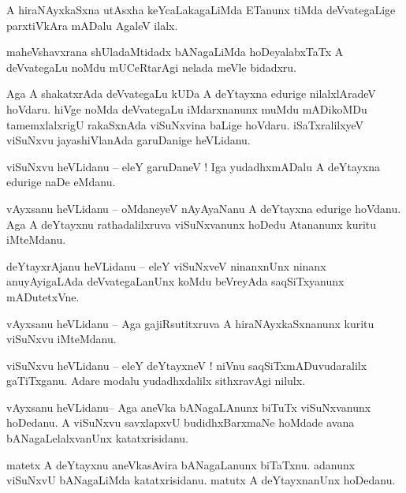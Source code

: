 \documentclass{article}
\begin{document}
\begin{mng}%
A hiraNAyxkaSxna utAsxha keYcaLakagaLiMda ETanunx tiMda deVvategaLige parxtiVkAra mADalu AgaleV ilalx.
\end{mng}

\begin{mng}%
maheVshavxrana shUladaMtidadx bANagaLiMda hoDeyalabxTaTx A deVvategaLu  noMdu mUCeRtarAgi nelada 
meVle bidadxru.
\end{mng}

\begin{mng}%
Aga A shakatxrAda deVvategaLu kUDa A deYtayxna edurige nilalxlAradeV hoVdaru. hiVge noMda 
deVvategaLu iMdarxnanunx muMdu mADikoMDu tamemxlalxrigU rakaSxnAda viSuNxvina baLige hoVdaru. 
iSaTxralilxyeV viSuNxvu jayashiVlanAda garuDanige heVLidanu.
\end{mng}

\begin{mng}%
viSuNxvu heVLidanu -- eleY garuDaneV ! Iga yudadhxmADalu A deYtayxna edurige naDe eMdanu.
\end{mng}

\begin{mng}%
vAyxsanu heVLidanu -- oMdaneyeV nAyAyaNanu A deYtayxna edurige hoVdanu. Aga A deYtayxnu 
rathadalilxruva viSuNxvanunx hoDedu Atananunx kuritu iMteMdanu.
\end{mng}

\begin{mng}%
deYtayxrAjanu heVLidanu -- eleY viSuNxveV ninanxnUnx ninanx anuyAyigaLAda deVvategaLanUnx koMdu 
beVreyAda saqSiTxyanunx mADutetxVne.
\end{mng}

\begin{mng}%
vAyxsanu heVLidanu -- Aga gajiRsutitxruva A hiraNAyxkaSxnanunx kuritu viSuNxvu iMteMdanu.
\end{mng}

\begin{mng}%
viSuNxvu heVLidanu -- eleY deYtayxneV ! niVnu saqSiTxmADuvudaralilx gaTiTxganu. Adare modalu 
yudadhxdalilx sithxravAgi nilulx.
\end{mng}

\begin{mng}%
vAyxsanu heVLidanu-- Aga aneVka bANagaLAnunx biTuTx viSuNxvanunx hoDedanu. A viSuNxvu savxlapxvU 
budidhxBarxmaNe hoMdade avana bANagaLelalxvanUnx katatxrisidanu.
\end{mng}

\begin{mng}%
matetx A deYtayxnu aneVkasAvira bANagaLanunx biTaTxnu. adanunx viSuNxvU bANagaLiMda katatxrisidanu. 
matutx A deYtayxnanUnx hoDedanu.
\end{mng}
\end{document}
